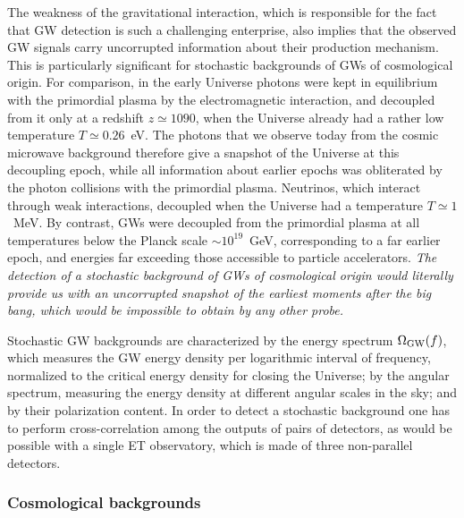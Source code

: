 The weakness of the gravitational interaction, which is responsible for the fact that  GW detection is such a challenging enterprise, 
also implies that the observed GW signals  carry uncorrupted information about their production mechanism. This is particularly significant for stochastic backgrounds of GWs of cosmological origin. For comparison, in the early Universe photons were kept in equilibrium with the primordial plasma by the electromagnetic interaction, and decoupled from it only at a redshift $z\simeq 1090$, when the Universe already had a rather low temperature $T\simeq 0.26$~eV. The photons that we observe today from the cosmic microwave background  therefore give a snapshot of the Universe at this decoupling epoch, while all information about earlier epochs was obliterated by the photon collisions with the primordial plasma. Neutrinos, which interact through weak interactions, decoupled  when the Universe had a temperature $T\simeq 1$~MeV.  By contrast, GWs were decoupled from the primordial plasma at all temperatures below the Planck scale $\sim 10^{19}$~GeV,
corresponding to a far earlier epoch, and energies far exceeding  those accessible to particle accelerators. {\em The detection of a stochastic background of GWs of cosmological origin would literally provide us with an uncorrupted  snapshot of the earliest moments after the big bang, which would be impossible to obtain by any other probe.}

Stochastic GW backgrounds are characterized by the  energy spectrum $\Omega_{\rm GW}(f)$, which measures the GW energy density per logarithmic interval of frequency, normalized to the critical energy density for closing the Universe; by the angular spectrum, measuring the energy density at different angular scales in the sky; and by their polarization content. In order to detect a stochastic background one has to perform cross-correlation among the outputs of pairs of detectors, as would be possible with a single ET observatory, which is made of three non-parallel detectors.

\subsubsection{Cosmological backgrounds}


